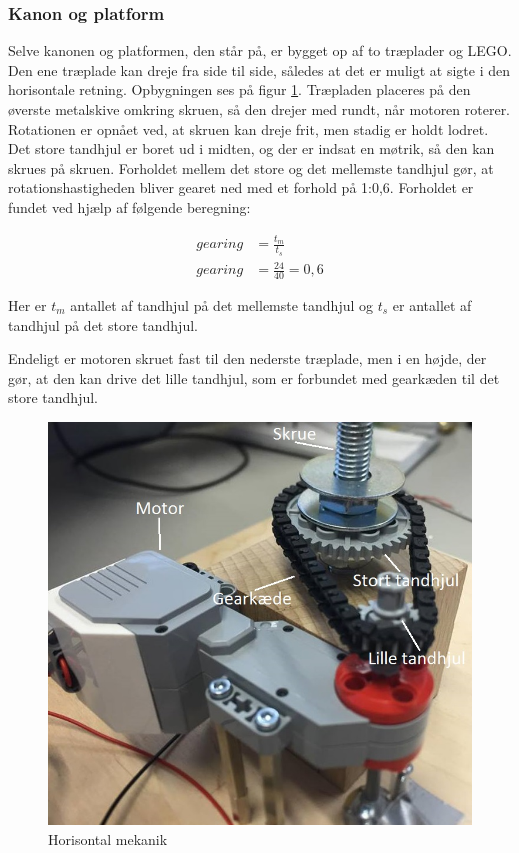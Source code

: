 \subsubsection{Kanon og platform}
Selve kanonen og platformen, den står på, er bygget op af to træplader og LEGO. Den ene træplade kan dreje fra side til side, således at det er muligt at sigte i den horisontale retning. Opbygningen ses på figur \ref{fig:Horisontalmekanik}. Træpladen placeres på den øverste metalskive omkring skruen, så den drejer med rundt, når motoren roterer. Rotationen er opnået ved, at skruen kan dreje frit, men stadig er holdt lodret. Det store tandhjul er boret ud i midten, og der er indsat en møtrik, så den kan skrues på skruen. Forholdet mellem det store og det mellemste tandhjul gør, at rotationshastigheden bliver gearet ned med et forhold på 1:0,6. Forholdet er fundet ved hjælp af følgende beregning: 

\begin{align}
	gearing&=\frac{t_{m}}{t_{s}} \\ \nonumber
	gearing&=\frac{24}{40}=0,6
\end{align}

Her er $t_{m}$ antallet af tandhjul på det mellemste tandhjul og $t_{s}$ er antallet af tandhjul på det store tandhjul. 

Endeligt er motoren skruet fast til den nederste træplade, men i en højde, der gør, at den kan drive det lille tandhjul, som er forbundet med gearkæden til det store tandhjul. 

\begin{figure}[H]
	\centering
	\includegraphics[width=1\textwidth]{Afsnit/DesignOgImplementering/images/horisontalMekanik}
	\caption{Horisontal mekanik}
	\label{fig:Horisontalmekanik}
\end{figure}

